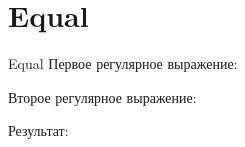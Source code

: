 \section{Equal}
\begin{frame}{Equal}
	Первое регулярное выражение:

	Второе регулярное выражение:

	Результат:

\end{frame}
